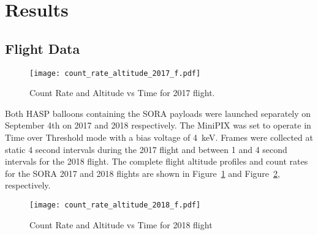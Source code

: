 \section{Results}
\label{Results}

\subsection{Flight Data}

\begin{figure}[H]
\centering
\texttt{[image: count\_rate\_altitude\_2017\_f.pdf]} %
\caption{Count Rate and Altitude vs Time for 2017 flight.}
\label{fig:ratealttime_2017}
\end{figure}
%
Both HASP balloons containing the SORA payloads were launched separately on September 4th on 2017 and 2018 respectively.  The MiniPIX was set to operate in Time over Threshold mode with a bias voltage of \SI{4}{\kilo\eV}.  Frames were collected at static 4 second intervals during the 2017 flight and between 1 and 4 second intervals for the 2018 flight.  The complete flight altitude profiles and count rates for the SORA  2017 and 2018 flights are shown in Figure~\ref{fig:ratealttime_2017} and Figure~\ref{fig:ratealttime_2018}, respectively.
%
\begin{figure}[H]
\centering
\texttt{[image: count\_rate\_altitude\_2018\_f.pdf]}%
\caption{Count Rate and Altitude vs Time for 2018 flight}
\label{fig:ratealttime_2018}
\end{figure}
